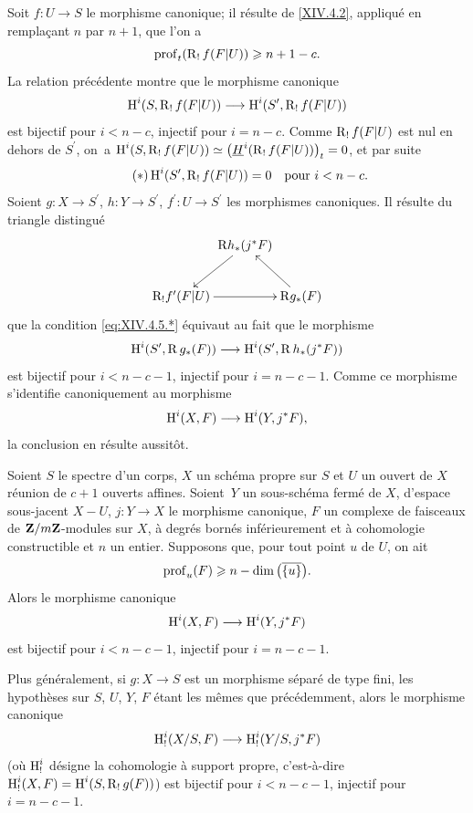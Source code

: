 Soit $f\colon U\to S$ le morphisme canonique; il r\'esulte de
\ref{XIV.4.2}, appliqu\'e en rempla\c cant $n$ par $n+1$, que l'on a
$$
\operatorname{prof}_{t}(\operatorname{R}_{!}f(F|U))\geqslant n+1-c.
$$
La relation pr\'ec\'edente montre que le morphisme canonique
$$
\H^{i}(S, \R_{!}f(F|U))\to\H^{i}(S^{\prime}, \R_{!}f(F|U))$$
est bijectif pour $i<n-c$, injectif pour $i=n-c$. Comme $\operatorname{R}_{!}f(F|U)$ est nul en dehors de $S^{\prime}$, on~a $\operatorname{H}^{i}(S, \operatorname{R}_{!}f(F|U))\simeq\big(\underline{H}^{i}(\operatorname{R}_{!}f(F|U))\big)_{t}=0$, et par suite
\begin{equation*} \label{eq:XIV.4.5.*} \tag{$*$}
\operatorname{H}^{i}(S^{\prime}, \operatorname{R}_{!}f(F|U))=0\quad\text{pour }i<n-c.
\end{equation*}
Soient $g\colon X\to S^{\prime}$, $h\colon Y\to S^{\prime}$, $f^{\prime}\colon U\to S^{\prime}$ les morphismes canoniques. Il r\'esulte du triangle distingu\'e
$$
\xymatrix@C=0pt{ & \mathrm{R} h_{\ast}(j^{\ast}F)\ar[ld] & \\
\mathrm{R}_{!}f^{\prime}(F|U)\ar[rr] & & \mathrm{R} g_{\ast}(F)\ar[lu] }$$
que la condition \eqref{eq:XIV.4.5.*} \'equivaut au fait que le morphisme
$$
\H^{i}(S^{\prime}, \R g_{\ast}(F))\to\H^{i}(S^{\prime}, \R h_{\ast}(j^{\ast}F))$$
est bijectif pour $i<n-c-1$, injectif pour $i=n-c-1$. Comme ce morphisme s'identifie canoniquement au morphisme
$$
\H^{i}(X, F)\to\H^{i}(Y, j^{\ast}F),
$$
la conclusion en r\'esulte aussit\^{o}t.

\begin{corollaire} \label{XIV.4.6}
Soient $S$ le spectre d'un corps, $X$ un sch\'ema propre sur $S$ et $U$ un ouvert de $X$ r\'eunion de $c+1$ ouverts affines. Soient~$Y$ un sous-sch\'ema ferm\'e de $X$, d'espace sous-jacent $X-U$, $j\colon Y\to X$ le morphisme canonique, $F$ un complexe de faisceaux de $\mathbf{Z}/m\mathbf{Z}$-modules sur $X$, \`a degr\'es born\'es inf\'erieurement et \`a cohomologie constructible et $n$ un entier. Supposons que, pour tout point $u$ de $U$, on ait
$$
\operatorname{prof}_{u}(F)\geqslant n-\dim\big(\overline{\{ u\} }\big).
$$
Alors le morphisme canonique
$$
\H^{i}(X, F)\to\H^{i}(Y, j^{\ast}F)$$
est bijectif pour $i<n-c-1$, injectif pour $i=n-c-1$.

Plus g\'en\'eralement, si $g\colon X\to S$ est un morphisme s\'epar\'e de type fini, les hypoth\`eses sur $S$, $U$, $Y$, $F$ \'etant les m\^emes que pr\'ec\'edemment, alors le morphisme canonique
$$
\H_{!}^{i}(X/S, F)\to\H_{!}^{i}(Y/S, j^{\ast}F)$$
(o\`u $\operatorname{H}_{!}^{i}$ d\'esigne la cohomologie \`a support propre, c'est-\`a-dire $\operatorname{H}_{!}^{i}(X, F)=\operatorname{H}^{i}(S, \operatorname{R}_{!}g(F))$) est bijectif pour $i<n-c-1$, injectif pour $i=n-c-1$.
\end{corollaire}

